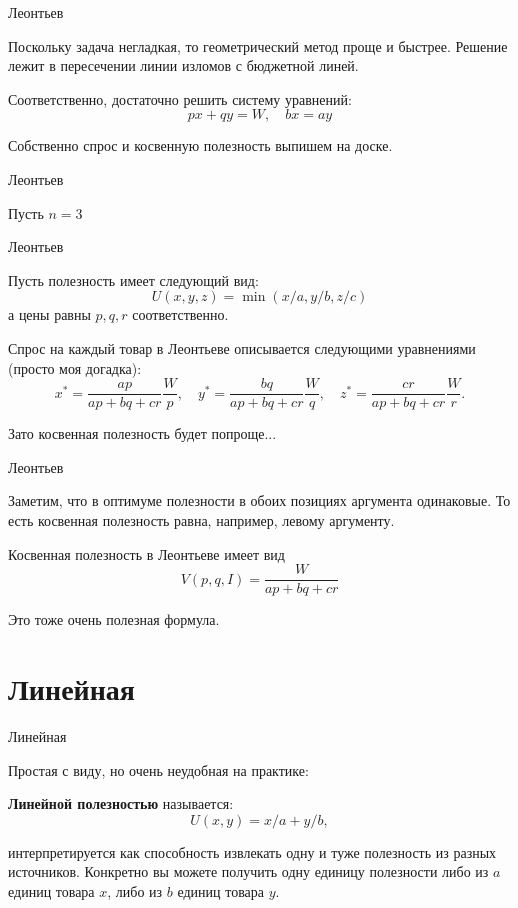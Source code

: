 \documentclass{beamer}
\begin{document}
\begin{frame}{Леонтьев}

Поскольку задача негладкая, то геометрический метод проще и быстрее. Решение лежит в пересечении линии изломов с бюджетной линей. 

Соответственно, достаточно решить систему уравнений:
$$ px + qy = W, \quad b x = a y$$

Собственно спрос и косвенную полезность выпишем на доске.

\end{frame}

\begin{frame}{Леонтьев}

Пусть $n = 3$

\end{frame}

\begin{frame}{Леонтьев}

Пусть полезность имеет следующий вид:
$$U(x,y,z) = \min(x/a, y/b, z/c)$$ 
а цены равны $p, q, r$ соответственно. 

Спрос на каждый товар в Леонтьеве описывается следующими уравнениями (просто моя догадка):
$$
x^{\ast} = \frac{ap}{ap + bq + cr} \frac{W}{p}, \quad
y^{\ast} = \frac{bq}{ap + bq + cr} \frac{W}{q}, \quad
z^{\ast} = \frac{cr}{ap + bq + cr} \frac{W}{r}.
$$

Зато косвенная полезность будет попроще...

\end{frame}

\begin{frame}{Леонтьев}

Заметим, что в оптимуме полезности в обоих позициях аргумента одинаковые. То есть косвенная полезность равна, например, левому аргументу.

Косвенная полезность в Леонтьеве имеет вид
$$V(p,q,I) = \frac{W}{ap + bq + cr}$$

Это тоже очень полезная формула.

\end{frame}


\section{Линейная}

\begin{frame}{Линейная}

Простая с виду, но очень неудобная на практике:

\begin{definition}
\textbf{Линейной полезностью} называется:
$$U(x, y) = x/a +y/b,$$ 
\end{definition}

интерпретируется как способность извлекать одну и туже полезность из разных источников.  Конкретно вы можете получить одну единицу полезности либо из $a$ единиц товара $x$, либо из $b$ единиц товара $y$. 


\end{frame}
\end{document}
